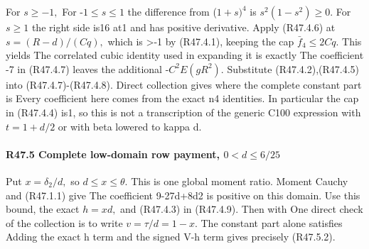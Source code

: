 For \(s\ge -1,\allowbreak \)
For -\(1\le s\le 1\) the difference from (\(1+s)^4\) is \(s^2(1-s^2)\ge 0.\)
For \(s\ge 1\) the right side is16 at1 and has positive derivative.
Apply (R47.4.6) at \(s=(R-d)/(Cq),\allowbreak \) which is >-1 by (R47.4.1), keeping
the cap \(\bar f_4\le 2Cq.\) This yields
The correlated cubic identity used in expanding it is exactly
The coefficient -7 in (R47.4.7) leaves the additional -\(C^2E(gR^2).\)
Substitute (R47.4.2),(R47.4.5) into (R47.4.7)-(R47.4.8). Direct collection gives
where the complete constant part is
Every coefficient here comes from the exact n4 identities. In particular
the cap in (R47.4.4) is1, so this is not a transcription of the generic
C100 expression with \(t=1+d/2\) or with beta lowered to kappa d.

\paragraph{R47.5 Complete low-domain row payment, \(0<d\le 6/25\)}

Put \(x=\delta_2/d,\allowbreak \) so \(d\le x\le \theta.\) This is one global moment ratio. Moment Cauchy and (R47.1.1) give
The coefficient 9-27d+8d2 is positive on this domain. Use this bound,
the exact \(h=xd,\allowbreak \) and (R47.4.3) in (R47.4.9). Then
with
One direct check of the collection is to write \(v=\tau/d=1-x.\) The
constant part alone satisfies
Adding the exact h term and the signed V-h term gives precisely (R47.5.2).

